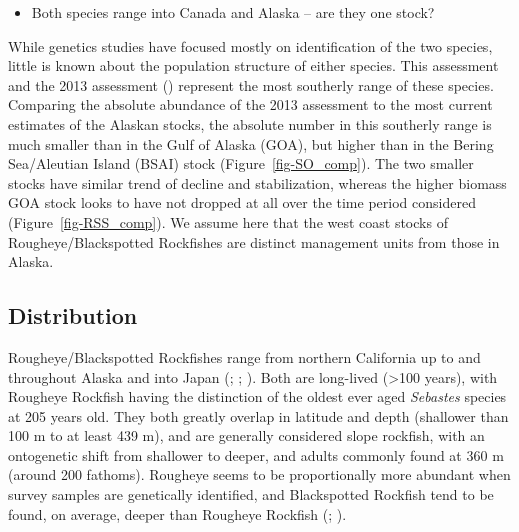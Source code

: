 \documentclass[
]{scrartcl}
\providecommand{\tightlist}{%
  \setlength{\itemsep}{0pt}\setlength{\parskip}{0pt}}\usepackage{longtable,booktabs,array}
\begin{document}
\begin{itemize}
\tightlist
\item
  Both species range into Canada and Alaska -- are they one stock?
\end{itemize}

While genetics studies have focused mostly on identification of the two
species, little is known about the population structure of either
species. This assessment and the 2013 assessment
()
represent the most southerly range of these species. Comparing the
absolute abundance of the 2013 assessment to the most current estimates
of the Alaskan stocks, the absolute number in this southerly range is
much smaller than in the Gulf of Alaska (GOA), but higher than in the
Bering Sea/Aleutian Island (BSAI) stock (Figure~\ref{fig-SO_comp}). The
two smaller stocks have similar trend of decline and stabilization,
whereas the higher biomass GOA stock looks to have not dropped at all
over the time period considered (Figure~\ref{fig-RSS_comp}). We assume
here that the west coast stocks of Rougheye/Blackspotted Rockfishes are
distinct management units from those in Alaska.

\subsection{Distribution}\label{distribution}

Rougheye/Blackspotted Rockfishes range from northern California up to
and throughout Alaska and into Japan
(;
;
). Both are
long-lived (\textgreater100 years), with Rougheye Rockfish having the
distinction of the oldest ever aged \emph{Sebastes} species at 205 years
old. They both greatly overlap in latitude and depth (shallower than 100
m to at least 439 m), and are generally considered slope rockfish, with
an ontogenetic shift from shallower to deeper, and adults commonly found
at 360 m (around 200 fathoms). Rougheye seems to be proportionally more
abundant when survey samples are genetically identified, and
Blackspotted Rockfish tend to be found, on average, deeper than Rougheye
Rockfish (; ).
\end{document}
